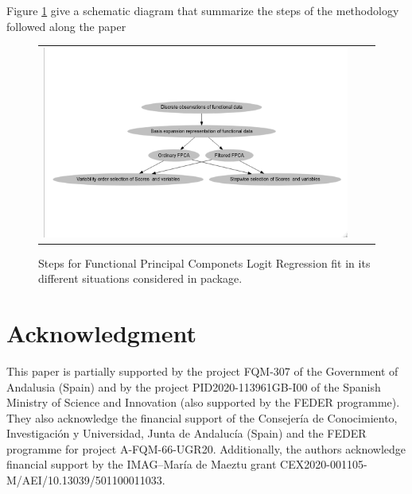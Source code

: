 Figure \ref{Diag} give a schematic diagram that summarize the steps of the  methodology followed along the paper

\begin{figure}
\begin{center}
\begin{tabular}{ccc}
\includegraphics[width=1.0\textwidth]{Graphs/Diagram.png}
\end{tabular}
\end{center}
\caption{Steps for Functional Principal Componets Logit Regression fit in its different situations considered in  package.}
\label{Diag}
\end{figure}


\section{Acknowledgment}

This paper is partially supported by the project FQM-307 of the Government of Andalusia (Spain) and  by the project PID2020-113961GB-I00 of the Spanish Ministry of Science and Innovation (also supported by the FEDER programme). They also acknowledge the financial support of the Consejería de Conocimiento, Investigación y Universidad, Junta de Andalucía (Spain) and the FEDER programme for project A-FQM-66-UGR20. Additionally, the authors acknowledge financial support by the IMAG–María de Maeztu grant CEX2020-001105-M/AEI/10.13039/501100011033. 



\address{Manuel Escabias\\
  Department of Statistics and Operation Research, University of Granada\\
  Facultad de Farmacia, Campus de Cartuja. 18071 Granada\\
  Spain\\
  ORCiD: 0000-0002-1653-9022\\
  }

